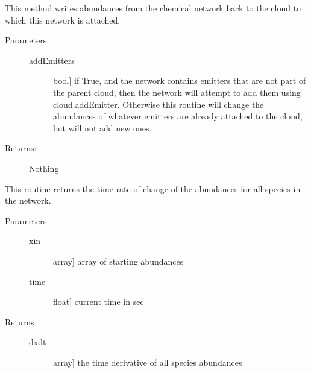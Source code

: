 \documentclass[letterpaper,10pt,english]{sphinxmanual}
\begin{document}
\begin{fulllineitems}
\begin{fulllineitems}
\label{fulldoc:despotic.chemistry.chemNetwork.applyAbundances}
This method writes abundances from the chemical network back
to the cloud to which this network is attached.
\begin{description}
\item[{Parameters}] \leavevmode\begin{description}
\item[{addEmitters}] \leavevmode{[}bool{]}
if True, and the network contains emitters that are not
part of the parent cloud, then the network will attempt
to add them using cloud.addEmitter. Otherwise this
routine will change the abundances of whatever emitters
are already attached to the cloud, but will not add new
ones.

\end{description}

\item[{Returns:}] \leavevmode
Nothing

\end{description}

\end{fulllineitems}


\begin{fulllineitems}
\label{fulldoc:despotic.chemistry.chemNetwork.dxdt}
This routine returns the time rate of change of the abundances
for all species in the network.
\begin{description}
\item[{Parameters}] \leavevmode\begin{description}
\item[{xin}] \leavevmode{[}array{]}
array of starting abundances

\item[{time}] \leavevmode{[}float{]}
current time in sec

\end{description}

\item[{Returns}] \leavevmode\begin{description}
\item[{dxdt}] \leavevmode{[}array{]}
the time derivative of all species abundances

\end{description}

\end{description}

\end{fulllineitems}


\end{fulllineitems}
\end{document}
